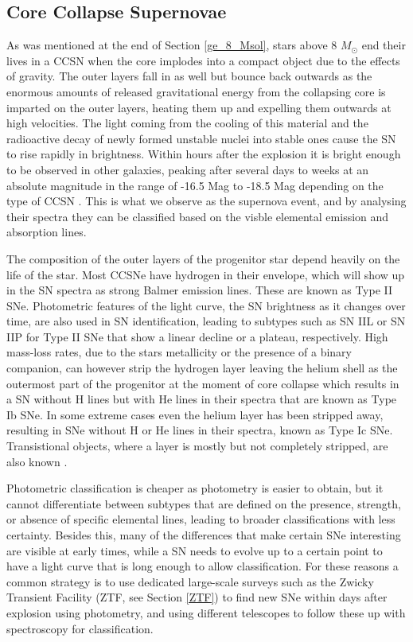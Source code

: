 \documentclass[a4paper,oneside,12pt, class=Latex/Classes/PhDthesisPSnPDF, crop=false]{standalone}
\begin{document}
\subsection{Core Collapse Supernovae}
\label{CCSN}
As was mentioned at the end of Section \ref{ge_8_Msol}, stars above 8 $M_\odot$ end their lives in a CCSN when the core implodes into a compact object due to the effects of gravity. The outer layers fall in as well but bounce back outwards as the enormous amounts of released gravitational energy from the collapsing core is imparted on the outer layers, heating them up and expelling them outwards at high velocities. The light coming from the cooling of this material and the radioactive decay of newly formed unstable nuclei into stable ones cause the SN to rise rapidly in brightness. Within hours after the explosion it is bright enough to be observed in other galaxies, peaking after several days to weeks at an absolute magnitude in the range of -16.5 Mag to -18.5 Mag depending on the type of CCSN \citep{SN_M_dist}. This is what we observe as the supernova event, and by analysing their spectra they can be classified based on the visble elemental emission and absorption lines.

The composition of the outer layers of the progenitor star depend heavily on the life of the star. Most CCSNe have hydrogen in their envelope, which will show up in the SN spectra as strong Balmer emission lines. These are known as Type II SNe. Photometric features of the light curve, the SN brightness as it changes over time, are also used in SN identification, leading to subtypes such as SN IIL or SN IIP for Type II SNe that show a linear decline or a plateau, respectively. High mass-loss rates, due to the stars metallicity or the presence of a binary companion, can however strip the hydrogen layer leaving the helium shell as the outermost part of the progenitor at the moment of core collapse which results in a SN without H lines but with He lines in their spectra that are known as Type Ib SNe. In some extreme cases even the helium layer has been stripped away, resulting in SNe without H or He lines in their spectra, known as Type Ic SNe. Transistional objects, where a layer is mostly but not completely stripped, are also known \citep{SN_large_pic}.

Photometric classification is cheaper as photometry is easier to obtain, but it cannot differentiate between subtypes that are defined on the presence, strength, or absence of specific elemental lines, leading to broader classifications with less certainty. Besides this, many of the differences that make certain SNe interesting are visible at early times, while a SN needs to evolve up to a certain point to have a light curve that is long enough to allow classification. For these reasons a common strategy is to use dedicated large-scale surveys such as the Zwicky Transient Facility (ZTF, see Section \ref{ZTF}) to find new SNe within days after explosion using photometry, and using different telescopes to follow these up with spectroscopy for classification.
\end{document}
